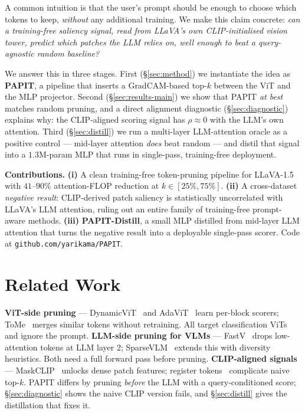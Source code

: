 \documentclass[10pt,twocolumn,letterpaper]{article}
\begin{document}
A common intuition is that the user's prompt should be enough to choose
which tokens to keep, \emph{without} any additional training. We make
this claim concrete: \emph{can a training-free saliency signal, read
from LLaVA's own CLIP-initialised vision tower, predict which patches
the LLM relies on, well enough to beat a query-agnostic random
baseline?}

We answer this in three stages. First (\S\ref{sec:method}) we instantiate
the idea as \textbf{PAPIT}, a pipeline that inserts a GradCAM-based
top-$k$ between the ViT and the MLP projector. Second
(\S\ref{sec:results-main}) we show that PAPIT \emph{at best} matches
random pruning, and a direct alignment diagnostic
(\S\ref{sec:diagnostic}) explains why: the CLIP-aligned scoring
signal has $\rho{\approx}0$ with the LLM's own attention. Third (\S\ref{sec:distill}) we run a multi-layer
LLM-attention oracle as a positive control --- mid-layer attention
\emph{does} beat random --- and distil that signal into a $1.3$M-param
MLP that runs in single-pass, training-free deployment.

\noindent\textbf{Contributions.}
\textbf{(i)} A clean training-free token-pruning pipeline for LLaVA-1.5
with $41$--$90\%$ attention-FLOP reduction at $k\!\in\![25\%,75\%]$.
\textbf{(ii)} A cross-dataset \emph{negative result}: CLIP-derived patch
saliency is statistically uncorrelated with LLaVA's LLM attention,
ruling out an entire family of training-free prompt-aware methods.
\textbf{(iii)} \textbf{PAPIT-Distill}, a small MLP distilled from
mid-layer LLM attention that turns the negative result into a
deployable single-pass scorer. Code at \texttt{github.com/yarikama/PAPIT}.

\section{Related Work}

\textbf{ViT-side pruning} —
DynamicViT~\cite{rao2021dynamicvit} and AdaViT~\cite{meng2022adavit}
learn per-block scorers; ToMe~\cite{bolya2023tome} merges similar
tokens without retraining. All target classification ViTs and ignore
the prompt.
\textbf{LLM-side pruning for VLMs} —
FastV~\cite{chen2024fastv} drops low-attention tokens at LLM layer 2;
SparseVLM~\cite{zhang2024sparsevlm} extends this with diversity
heuristics. Both need a full forward pass before pruning.
\textbf{CLIP-aligned signals} —
MaskCLIP~\cite{zhou2022maskclip} unlocks dense patch features;
register tokens~\cite{darcet2024registers} complicate naive top-$k$.
PAPIT differs by pruning \emph{before} the LLM with a query-conditioned
score; \S\ref{sec:diagnostic} shows the naive CLIP version fails, and
\S\ref{sec:distill} gives the distillation that fixes it.
\end{document}
